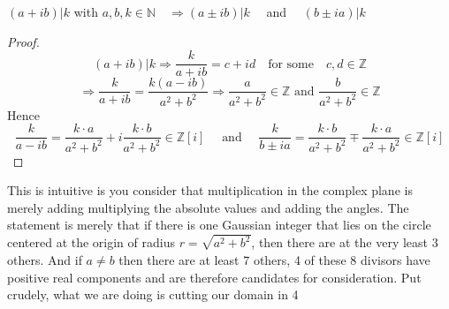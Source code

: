 \documentclass[11pt]{article}
\newcommand{\N}{\mathbb{N}}
\newcommand{\Z}{\mathbb{Z}}
\newcommand{\RA}{\Rightarrow}
\newenvironment{problem}[2][\to]{\begin{trivlist}
\item[\hskip \labelsep {\bfseries #1}\hskip \labelsep {\bfseries #2.}]}{\end{trivlist}}
\begin{document}
\begin{problem}[Observation 1]\\ 
$(a+ib) | k$ with $a,b,k\in\N \quad \RA (a\pm ib) | k\quad$ and $\quad (b \pm ia) | k$
\end{problem}
\begin{proof}
$$
(a+ib)|k \RA \frac{k}{a+ib} = c+id \quad \text{for some}\quad c,d\in \Z
$$
$$
\RA \frac{k}{a+ib} = \frac{k(a-ib)}{a^2 + b^2} \RA \frac{a}{a^2+b^2}\in \Z \text{ and } \frac{b}{a^2+b^2}\in \Z
$$
Hence
$$
\frac{k}{a-ib} = \frac{k\cdot a}{a^2+b^2} + i\frac{k\cdot b}{a^2+b^2} \in \Z[i] 
\quad \text{ and } \quad
\frac{k}{b\pm ia} = \frac{k\cdot b}{a^2+b^2} \mp \frac{k\cdot a}{a^2+b^2} \in \Z[i]
$$
\end{proof}
This is intuitive is you consider that multiplication in the complex plane is merely adding multiplying the absolute values and adding the angles. The statement is merely that if there is one Gaussian integer that lies on the circle centered at the origin of radius $r = \sqrt{a^2+b^2}$, then there are at the very least 3 others. And if $a\neq b$ then there are at least 7 others, 4 of these 8 divisors have positive real components and are therefore candidates for consideration. Put crudely, what we are doing is cutting our domain in 4\\
\end{document}
